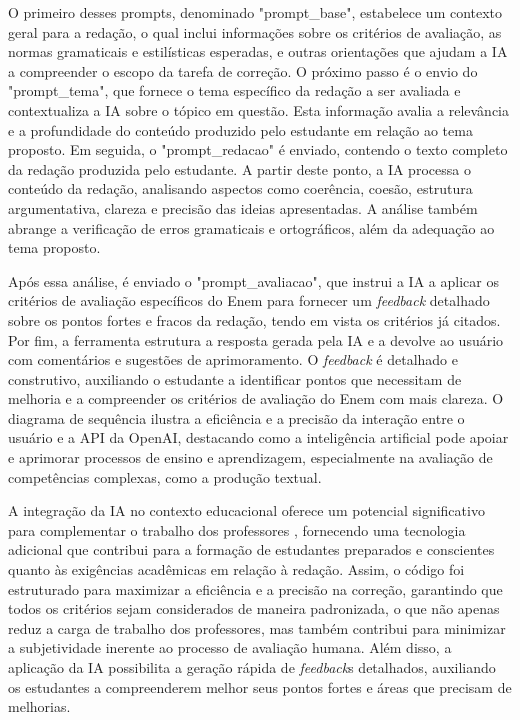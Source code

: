 \documentclass[portuguese]{textolivre}
\begin{document}
O primeiro desses prompts, denominado "prompt\_base", estabelece um contexto geral para a redação, o qual inclui informações sobre os critérios de avaliação, as normas gramaticais e estilísticas esperadas, e outras orientações que ajudam a IA a compreender o escopo da tarefa de correção. O próximo passo é o envio do "prompt\_tema", que fornece o tema específico da redação a ser avaliada e contextualiza a IA sobre o tópico em questão. Esta informação avalia a relevância e a profundidade do conteúdo produzido pelo estudante em relação ao tema proposto. Em seguida, o "prompt\_redacao" é enviado, contendo o texto completo da redação produzida pelo estudante. A partir deste ponto, a IA processa o conteúdo da redação, analisando aspectos como coerência, coesão, estrutura argumentativa, clareza e precisão das ideias apresentadas. A análise também abrange a verificação de erros gramaticais e ortográficos, além da adequação ao tema proposto.

Após essa análise, é enviado o "prompt\_avaliacao", que instrui a IA a aplicar os critérios de avaliação específicos do Enem para fornecer um \textit{feedback} detalhado sobre os pontos fortes e fracos da redação, tendo em vista os critérios já citados. Por fim, a ferramenta estrutura a resposta gerada pela IA e a devolve ao usuário com comentários e sugestões de aprimoramento. O \textit{feedback} é detalhado e construtivo, auxiliando o estudante a identificar pontos que necessitam de melhoria e a compreender os critérios de avaliação do Enem com mais clareza. O diagrama de sequência ilustra a eficiência e a precisão da interação entre o usuário e a API da OpenAI, destacando como a inteligência artificial pode apoiar e aprimorar processos de ensino e aprendizagem, especialmente na avaliação de competências complexas, como a produção textual. 

A integração da IA no contexto educacional oferece um potencial significativo para complementar o trabalho dos professores \cite{SacheteSalcedo}, fornecendo uma tecnologia adicional que contribui para a formação de estudantes preparados e conscientes quanto às exigências acadêmicas em relação à redação. Assim, o código foi estruturado para maximizar a eficiência e a precisão na correção, garantindo que todos os critérios sejam considerados de maneira padronizada, o que não apenas reduz a carga de trabalho dos professores, mas também contribui para minimizar a subjetividade inerente ao processo de avaliação humana. Além disso, a aplicação da IA possibilita a geração rápida de \textit{feedback}s detalhados, auxiliando os estudantes a compreenderem melhor seus pontos fortes e áreas que precisam de melhorias.
\end{document}

